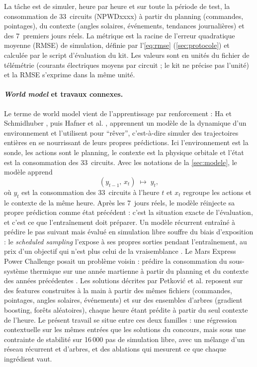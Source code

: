 \documentclass[11pt,a4paper]{article}
\begin{document}
La tâche est de simuler, heure par heure et sur toute la période de test, la consommation de 33~circuits (NPWDxxxx) à partir du planning (commandes, pointages), du contexte (angles solaires, événements, tendances journalières) et des 7~premiers jours réels. La métrique est la racine de l'erreur quadratique moyenne (RMSE) de simulation, définie par l'\autoref{eq:rmse} (\autoref{sec:protocole}) et calculée par le script d'évaluation du kit. Les valeurs sont en unités du fichier de télémétrie (courants électriques moyens par circuit ; le kit ne précise pas l'unité) et la RMSE s'exprime dans la même unité.

\paragraph{\emph{World model} et travaux connexes.}
Le terme de world model vient de l'apprentissage par renforcement : Ha et Schmidhuber \citep{ha2018world}, puis Hafner et al. \citep{hafner2019planet,hafner2020dream}, apprennent un modèle de la dynamique d'un environnement et l'utilisent pour \enquote{rêver}, c'est-à-dire simuler des trajectoires entières en se nourrissant de leurs propres prédictions. Ici l'environnement est la sonde, les actions sont le planning, le contexte est la physique orbitale et l'état est la consommation des 33~circuits. Avec les notations de la \autoref{sec:modele}, le modèle apprend
\begin{equation*}
  (y_{t-1},\, x_t) \;\longmapsto\; y_t ,
\end{equation*}
où $y_t$ est la consommation des 33~circuits à l'heure $t$ et $x_t$ regroupe les actions et le contexte de la même heure. Après les 7~jours réels, le modèle réinjecte sa propre prédiction comme état précédent : c'est la situation exacte de l'évaluation, et c'est ce que l'entraînement doit préparer. Un modèle récurrent entraîné à prédire le pas suivant mais évalué en simulation libre souffre du biais d'exposition : le \emph{scheduled sampling} \citep{bengio2015scheduled} l'expose à ses propres sorties pendant l'entraînement, au prix d'un objectif qui n'est plus celui de la vraisemblance \citep{huszar2015hownot}. Le Mars Express Power Challenge posait un problème voisin : prédire la consommation du sous-système thermique sur une année martienne à partir du planning et du contexte des années précédentes \citep{lucas2017mars}. Les solutions décrites par Petković et al. \citep{petkovic2019machine} reposent sur des features construites à la main à partir des mêmes fichiers (commandes, pointages, angles solaires, événements) et sur des ensembles d'arbres (gradient boosting, forêts aléatoires), chaque heure étant prédite à partir du seul contexte de l'heure. Le présent travail se situe entre ces deux familles : une régression contextuelle sur les mêmes entrées que les solutions du concours, mais sous une contrainte de stabilité sur 16\,000 pas de simulation libre, avec un mélange d'un réseau récurrent et d'arbres, et des ablations qui mesurent ce que chaque ingrédient vaut.
\end{document}
